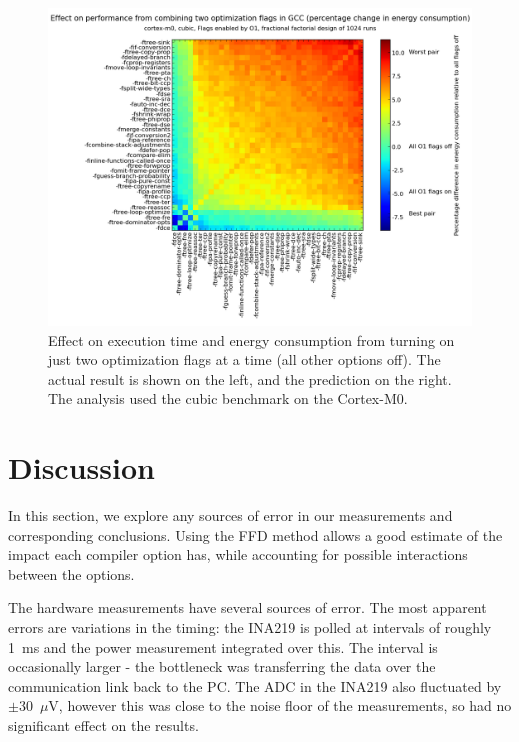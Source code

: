 \documentclass[twocolumn]{article}
\let\oldcaption\caption
\renewcommand{\caption}[1]{\oldcaption{\textup{#1}}}
\begin{document}
\begin{figure}
\begin{minipage}[l]{0.07\columnwidth}
    \end{minipage}
    \hfill
    \begin{minipage}[r]{0.95\columnwidth}
        \centering
		\includegraphics[width=0.9\linewidth, clip, trim= 8.8cm 0 7cm 2cm]{cortex-m0/o1cub_-7p5_10_pred.png}
    \end{minipage}
    \caption{Effect on execution time and energy consumption from turning on just two optimization flags at a time (all other options off). The actual result is shown on the left, and the prediction on the right. The analysis used the cubic benchmark on the Cortex-M0.}
    \label{Fig:twoway_cubic}
\end{figure}



\section{Discussion}

In this section, we explore any sources of error in our measurements and corresponding conclusions.
Using the FFD method allows a good estimate of the impact each compiler option has, while accounting for possible interactions between the options.

The hardware measurements have several sources of error. The most apparent errors are variations in the timing: the INA219 is polled at intervals of roughly 1~ms and the power measurement integrated over this. The interval is occasionally larger - the bottleneck was transferring the data over the communication link back to the PC. The ADC in the INA219 also fluctuated by $\pm$30~$\mu$V, however this was close to the noise floor of the measurements, so had no significant effect on the results.
\end{document}
